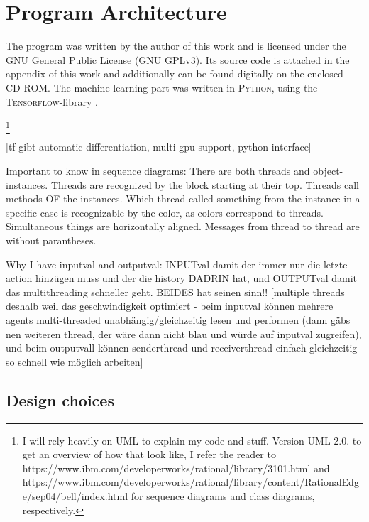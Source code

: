 \chapter{Program Architecture}

\label{ch:program}

The program was written by the author of this work and is licensed under the GNU General Public License (GNU GPLv3). Its source code is attached in the appendix of this work and additionally can be found digitally on the enclosed CD-ROM. The machine learning part was written in \textsc{Python}, using the \textsc{Tensorflow}-library \parencite{abadi_tensorflow:_2015}.

\footnote{I will rely heavily on UML to explain my code and stuff. Version UML 2.0. to get an overview of how that look like, I refer the reader to https://www.ibm.com/developerworks/rational/library/3101.html and https://www.ibm.com/developerworks/rational/library/content/RationalEdge/sep04/bell/index.html for sequence diagrams and class diagrams, respectively.}

[tf gibt automatic differentiation, multi-gpu support, python interface]

Important to know in sequence diagrams: There are both threads and object-instances. Threads are recognized by the block starting at their top. Threads call methods OF the instances. Which thread called something from the instance in a specific case is recognizable by the color, as colors correspond to threads. Simultaneous things are horizontally aligned. Messages from thread to thread are without parantheses.

Why I have inputval and outputval: INPUTval damit der immer nur die letzte action hinzügen muss und der die history DADRIN hat, und OUTPUTval damit das multithreading schneller geht. BEIDES hat  seinen sinn!!
[multiple threads deshalb weil das geschwindigkeit optimiert - beim inputval können mehrere agents multi-threaded unabhängig/gleichzeitig lesen und performen (dann gäbs nen weiteren thread, der wäre dann nicht blau und würde auf inputval zugreifen), und beim outputvall können senderthread und receiverthread einfach gleichzeitig so schnell wie möglich arbeiten]

\section{Design choices}



